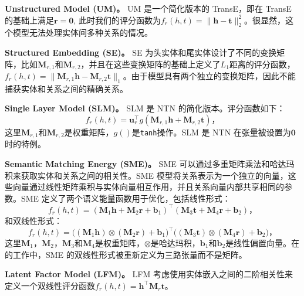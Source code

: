     \textbf{Unstructured Model (UM)。} UM \cite{bordes2012joint,bordes2014semantic} 是一个简化版本的 TransE，即在 TransE 的基础上满足$\mathbf{r} = \mathbf{0}$, 此时我们的评分函数为$f_r(h, t) =  \|\mathbf{h} - \mathbf{t}\|_{2}^{2}$。很显然，这个模型无法处理实体间多种关系的情况。

    \textbf{Structured Embedding (SE)。} SE \cite{bordes2011learning} 为头实体和尾实体设计了不同的变换矩阵，比如$\mathbf{M}_{r, 1}$和$\mathbf{M}_{r, 2}$，并且在这些变换矩阵的基础上定义了$L_1$距离的评分函数，$f_r(h, t) =  \| \mathbf{M}_{r, 1} \mathbf{h} - \mathbf{M}_{r, 2} \mathbf{t} \|_1$。由于模型具有两个独立的变换矩阵，因此不能捕获实体和关系之间的精确关系。

    \textbf{Single Layer Model (SLM)。} SLM 是 NTN \cite{socher2013reasoning}的简化版本。评分函数如下：
    \begin{equation}
    f_{r}(h, t) = \mathbf{u}_r^\top g (\mathbf{M}_{r, 1} \mathbf{h} + \mathbf{M}_{r, 2} \mathbf{t})，
    \end{equation}
    这里$\mathbf{M}_{r, 1}$和$\mathbf{M}_{r, 2}$是权重矩阵，$g()$是\texttt{tanh}操作。SLM 是 NTN 在张量被设置为$\mathbf{0}$时的特例。


    \textbf{Semantic Matching Energy (SME)。} SME \cite{bordes2012joint,bordes2014semantic} 可以通过多重矩阵乘法和哈达玛积来获取实体和关系之间的相关性。SME 模型将关系表示为一个独立的向量，这些向量通过线性矩阵乘积与实体向量相互作用，并且关系向量内部共享相同的参数。SME 定义了两个语义能量函数用于优化，包括线性形式：
    \begin{equation}
    f_r(h, t) = (\mathbf{M}_{1} \mathbf{h} + \mathbf{M}_{2} \mathbf{r} + \mathbf{b}_1 )^{\top} (\mathbf{M}_{3} \mathbf{t} + \mathbf{M}_{4} \mathbf{r} + \mathbf{b}_2)，
    \end{equation}
    和双线性形式：
    \begin{equation}
    f_r(h, t) = \big( (\mathbf{M}_{1} \mathbf{h}) \otimes (\mathbf{M}_{2} \mathbf{r}) + \mathbf{b}_1 \big)^{\top} \big( (\mathbf{M}_{3} \mathbf{t}) \otimes (\mathbf{M}_{4} \mathbf{r}) + \mathbf{b}_2 \big)，
    \end{equation}
    这里$\mathbf{M}_{1}$，$\mathbf{M}_{2}$，$\mathbf{M}_{3}$和$\mathbf{M}_{4}$是权重矩阵，$\otimes$是哈达玛积，$\mathbf{b}_1$和$\mathbf{b}_2$是线性偏置向量。在 \cite{bordes2014semantic}的工作中，SME 的双线性形式被重新定义为三路张量而不是矩阵。

    \textbf{Latent Factor Model (LFM)。} LFM \cite{jenatton2012latent,sutskever2009modelling} 考虑使用实体嵌入之间的二阶相关性来定义一个双线性评分函数$f_r(h, t) = \mathbf{h}^{\top}\mathbf{M}_r\mathbf{t}$。

